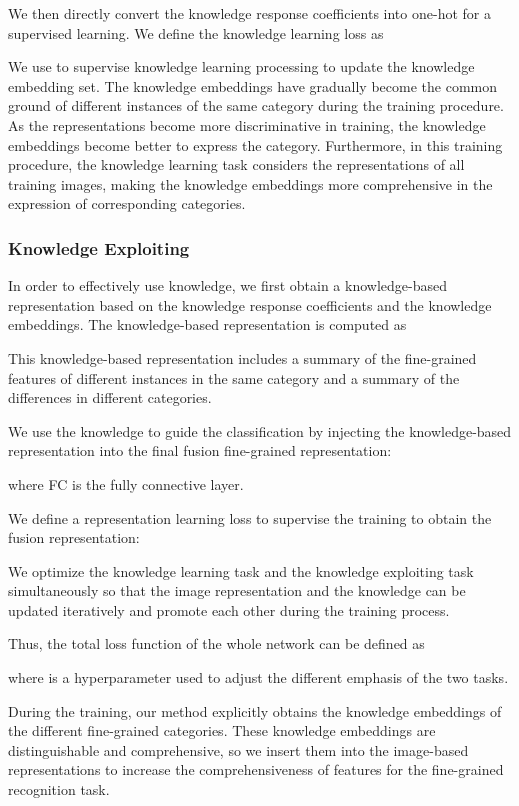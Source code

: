 \documentclass[5p,twocolumn]{elsarticle}
\begin{document}
We then directly convert the knowledge response coefficients  into one-hot for a supervised learning. We define the knowledge learning loss as


We use  to supervise knowledge learning processing to update the knowledge embedding set.
The knowledge embeddings have gradually become the common ground of different instances of the same category during the training procedure. As the representations become more discriminative in training, the knowledge embeddings become better to express the category. Furthermore, in this training procedure, the knowledge learning task considers the representations of all training images, making the knowledge embeddings more comprehensive in the expression of corresponding categories.

\subsubsection{Knowledge Exploiting}
In order to effectively use knowledge, we first obtain a knowledge-based representation based on the knowledge response coefficients and the knowledge embeddings.
The knowledge-based representation  is computed as 


This knowledge-based representation includes a summary of the fine-grained features of different instances in the same category and a summary of the differences in different categories.
 
We use the knowledge to guide the classification by injecting the knowledge-based representation  into the final fusion fine-grained representation:

where FC is the fully connective layer.

We define a representation learning loss to supervise the training to obtain the fusion representation: 


We optimize the knowledge learning task and the knowledge exploiting task simultaneously so that the image representation and the knowledge can be updated iteratively and promote each other during the training process.

Thus, the total loss function of the whole network can be defined as
 
where  is a hyperparameter used to adjust the different emphasis of the two tasks.  

During the training, our method explicitly obtains the knowledge embeddings of the different fine-grained categories. These knowledge embeddings are distinguishable and comprehensive, so we insert them into the image-based representations to increase the comprehensiveness of features for the fine-grained recognition task.
\end{document}
